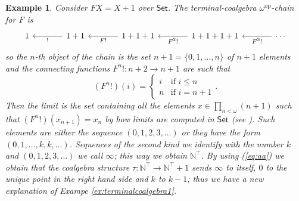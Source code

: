 \documentclass[letterpaper, 11pt, oneside]{memoir}
\theoremstyle{myteo}
\newtheorem{example}[theorem]{Example}
\numberwithin{equation}{section}
\newcommand{\Set}{\textsf{Set}}
\newcommand{\op}{\text{op}}
\newcommand{\N}{\mathbb{N}}
\begin{document}
\begin{example}
  Consider \(FX = X + 1\) over \(\Set\).
  The terminal-coalgebra \(\omega^\op\)-chain for \(F\) is
  \begin{equation*}
    \begin{tikzcd}[sep = large]
      1  & 1 + 1 \ar[l, "!"] & 1 + 1 + 1  \ar[l, "F!"] & 1 + 1 + 1 + 1 \ar[l, "F^2!"] & \cdots \ar[l, "F^3!"]
    \end{tikzcd}
  \end{equation*}
  so the \(n\)-th object of the chain is the set \(n + 1 = \{0, 1, \ldots, n\}\) of \(n + 1\) elements and the connecting functions \(F^n! : n + 2 \to n + 1\) are such that
  \begin{equation*}
    (F^n!)(i) = 
    \begin{cases}
      i & \text{if } i \leq n\\
      n & \text{if } i = n + 1
    \end{cases}.
  \end{equation*}
  Then the limit is the set containing all the elements \(x \in \prod_{n < \omega} (n + 1)\) such that \((F^n!)(x_{n+1}) = x_n\) by how limits are computed in \(\Set\) (see \cite[Chapter 2, Section 8]{handbook1}).
  Such elements are either the sequence \((0,1,2,3, \ldots)\) or they have the form \((0,1, \ldots, k, k, \ldots)\).
  Sequences of the second kind we identify with the number \(k\) and \((0,1,2,3, \ldots)\) we call \(\infty\); this way we obtain \(\mathbb{N}^\top\).
  By using (\ref{eq:aa}) we obtain that the coalgebra structure \(\tau: \N^\top \to \N^\top + 1\) sends \(\infty\) to itself, \(0\) to the unique point in the right hand side and \(k\) to \(k-1\); thus we have a new explanation of Exampe \ref{ex:terminalcoalgebra1}.
\end{example}
\end{document}
